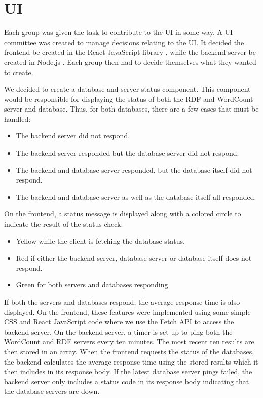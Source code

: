 \section{UI}
Each group was given the task to contribute to the \knox{} UI in some way. 
A UI committee was created to manage decisions relating to the UI. 
It decided the frontend be created in the React JavaScript library \cite{Reactjs}, while the backend server be created in Node.js \cite{Nodejs}.
Each group then had to decide themselves what they wanted to create. 


We decided to create a database and server status component. 
This component would be responsible for displaying the status of both the RDF and WordCount server and database. 
Thus, for both databases, there are a few cases that must be handled:
\begin{itemize}
	\item The backend server did not respond.
	\item The backend server responded but the database server did not respond.
	\item The backend and database server responded, but the database itself did not respond.
	\item The backend and database server as well as the database itself all responded.
\end{itemize}

On the frontend, a status message is displayed along with a colored circle to indicate the result of the status check:
\begin{itemize}
	\item Yellow while the client is fetching the database status.
	\item Red if either the backend server, database server or database itself does not respond.
	\item Green for both servers and databases responding.
\end{itemize}
If both the servers and databases respond, the average response time is also displayed.
On the frontend, these features were implemented using some simple CSS and React JavaScript code where we use the Fetch API to access the backend server.
On the backend server, a timer is set up to ping both the WordCount and RDF servers every ten minutes.
The most recent ten results are then stored in an array.
When the frontend requests the status of the databases, the backend calculates the average response time using the stored results which it then includes in its response body.
If the latest database server pings failed, the backend server only includes a status code in its response body indicating that the database servers are down.


